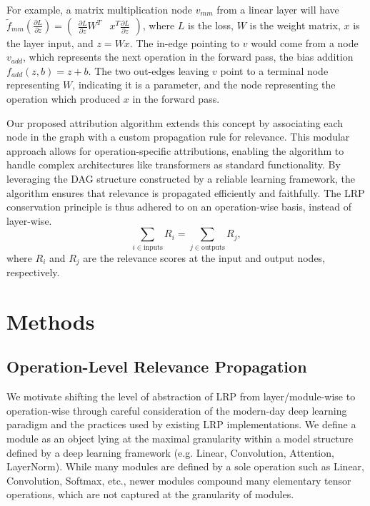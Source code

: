 \documentclass{article}
\begin{document}
For example, a matrix multiplication node $v_{mm}$ from a linear layer will have $\tilde{f}_{mm}(\frac{\partial L}{\partial z}) = \begin{pmatrix} \frac{\partial L}{\partial z} W^T & x^T \frac{\partial L}{\partial z} \end{pmatrix}$, where $L$ is the loss, $W$ is the weight matrix, $x$ is the layer input, and $z = Wx$.
The in-edge pointing to $v$ would come from a node $v_{add}$, which represents the next operation in the forward pass, the bias addition $f_{add}(z, b) = z + b$. 
The two out-edges leaving $v$ point to a terminal node representing $W$, indicating it is a parameter, and the node representing the operation which produced $x$ in the forward pass.

Our proposed attribution algorithm extends this concept by associating each node in the graph with a custom propagation rule for relevance. This modular approach allows for operation-specific attributions, enabling the algorithm to handle complex architectures like transformers as standard functionality.
By leveraging the DAG structure constructed by a reliable learning framework, the algorithm ensures that relevance is propagated efficiently and faithfully.
The LRP conservation principle is thus adhered to on an operation-wise basis, instead of layer-wise.
\begin{equation}
\sum_{i \in \text{inputs}} R_i = \sum_{j \in \text{outputs}} R_j,
\end{equation}
where $R_i$ and $R_j$ are the relevance scores at the input and output nodes, respectively.


\section{Methods}
\subsection{Operation-Level Relevance Propagation}
\label{sec:op-level-lrp}
We motivate shifting the level of abstraction of LRP from layer/module-wise to operation-wise through careful consideration of the modern-day deep learning
paradigm and the practices used by existing LRP implementations. We define a module as an object lying at the maximal granularity
within a model structure defined by a deep learning framework (e.g. Linear, Convolution, Attention, LayerNorm).
While many modules are defined by a sole operation such as Linear, Convolution, Softmax, etc., newer modules compound many
elementary tensor operations, which are not captured at the granularity of modules.
\end{document}

